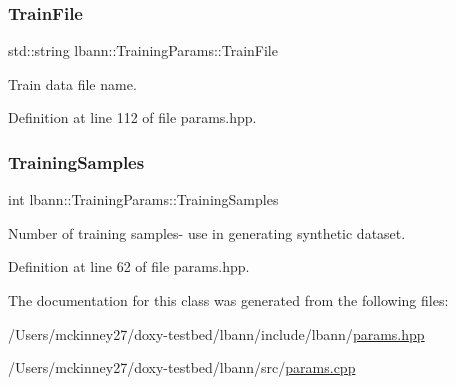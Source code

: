\subsubsection{\texorpdfstring{Train\+File}{TrainFile}}
{\footnotesize\ttfamily std\+::string lbann\+::\+Training\+Params\+::\+Train\+File}



Train data file name. 



Definition at line 112 of file params.\+hpp.

\mbox{\label{classlbann_1_1TrainingParams_adf012a044d64191b7d0de8b0278c7060}} 
\subsubsection{\texorpdfstring{Training\+Samples}{TrainingSamples}}
{\footnotesize\ttfamily int lbann\+::\+Training\+Params\+::\+Training\+Samples}



Number of training samples-\/ use in generating synthetic dataset. 



Definition at line 62 of file params.\+hpp.



The documentation for this class was generated from the following files\+:\begin{DoxyCompactItemize}
\item 
/\+Users/mckinney27/doxy-\/testbed/lbann/include/lbann/\hyperlink{params_8hpp}{params.\+hpp}\item 
/\+Users/mckinney27/doxy-\/testbed/lbann/src/\hyperlink{params_8cpp}{params.\+cpp}\end{DoxyCompactItemize}
